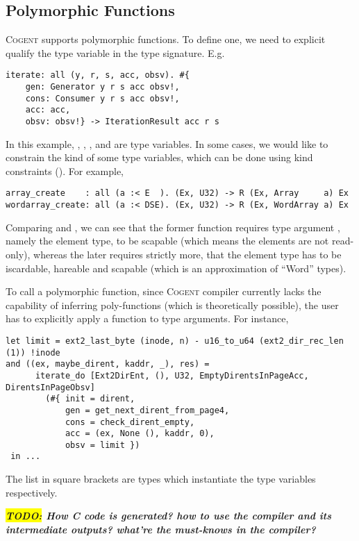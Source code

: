 \documentclass[a4paper]{article}
\newcommand{\TODO}[1]{\textbf{\textsl{\colorbox{yellow}{TODO:} #1}}}
\newcommand{\cogent}{\textsc{Cogent}\xspace}
\newcommand{\Cogent}{\cogent}
\begin{document}
\subsection{Polymorphic Functions}
\Cogent supports polymorphic functions. To define one, we need to explicit qualify the type variable
in the type signature. E.g.\
\begin{lstlisting}[language=Cogent]
iterate: all (y, r, s, acc, obsv). #{
	gen: Generator y r s acc obsv!,
	cons: Consumer y r s acc obsv!,
	acc: acc,
	obsv: obsv!} -> IterationResult acc r s
\end{lstlisting}
In this example, , , ,  and  are type variables. In some cases,
we would like to constrain the kind of some type variables, which can be done using kind constraints (\code{:<}).
For example,
\begin{lstlisting}[language=Cogent]
array_create    : all (a :< E  ). (Ex, U32) -> R (Ex, Array     a) Ex
wordarray_create: all (a :< DSE). (Ex, U32) -> R (Ex, WordArray a) Ex
\end{lstlisting}
Comparing  and , we can see that the former function requires type argument
\code{a}, namely the element type, to be \code{E}scapable (which means the elements are not read-only), whereas
the later requires strictly more, that the element type
has to be iscardable, hareable and scapable (which is an approximation of ``Word'' types).

To call a polymorphic function, since \cogent compiler currently lacks the capability of inferring poly-functions (which is
theoretically possible), the user has to explicitly apply a function to type arguments. For instance,
\begin{lstlisting}[language=Cogent]
let limit = ext2_last_byte (inode, n) - u16_to_u64 (ext2_dir_rec_len (1)) !inode
and ((ex, maybe_dirent, kaddr, _), res) =
      iterate_do [Ext2DirEnt, (), U32, EmptyDirentsInPageAcc, DirentsInPageObsv]
        (#{ init = dirent,
            gen = get_next_dirent_from_page4,
            cons = check_dirent_empty,
            acc = (ex, None (), kaddr, 0),
            obsv = limit })
 in ...
\end{lstlisting}
The list in square brackets are types which instantiate the type variables respectively.

\TODO{How C code is generated? how to use the compiler and its intermediate outputs? what're the must-knows in the compiler?}
\end{document}
